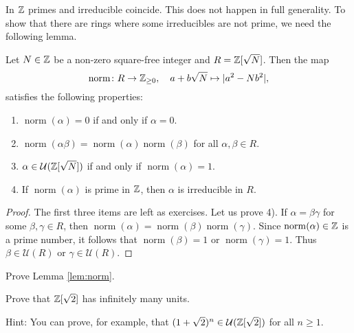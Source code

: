 In $\mathbb{Z}$ primes and irreducible coincide. 
This does not happen in full generality. 
To show that there are rings where some irreducibles are not prime, 
we need the following lemma. 

\begin{lemma}
\label{lem:norm}
Let $N\in\mathbb{Z}$ be a non-zero square-free integer and $R=\mathbb{Z}[\sqrt{N}]$. Then 
the map 
\[
	\operatorname{norm}\colon R\to\mathbb{Z}_{\geq0},
\quad a+b\sqrt{N}\mapsto 
|a^2-Nb^2|,
\]
satisfies the following properties:
\begin{enumerate}
	\item $\operatorname{norm}(\alpha)=0$ if and only if $\alpha=0$. 
	\item $\operatorname{norm}(\alpha\beta)=\operatorname{norm}(\alpha)\operatorname{norm}(\beta)$ for all $\alpha,\beta\in R$. 
	\item $\alpha\in\mathcal{U}(\mathbb{Z}[\sqrt{N}])$ if and only if $\operatorname{norm}(\alpha)=1$. 
	\item If $\operatorname{norm}(\alpha)$ is prime in $\mathbb{Z}$, then $\alpha$ is irreducible in $R$. 
\end{enumerate}	
\end{lemma}

\begin{proof}
	The first three items are left as exercises. Let us prove 4). 
	If $\alpha=\beta\gamma$ for some $\beta,\gamma\in R$, then
	$\operatorname{norm}(\alpha)=\operatorname{norm}(\beta)\operatorname{norm}(\gamma)$. Since $\operatorname{norm}(\alpha)\in\mathbb{Z}$ is a prime number, it follows that
	$\operatorname{norm}(\beta)=1$ or $\operatorname{norm}(\gamma)=1$. Thus $\beta\in\mathcal{U}(R)$ or $\gamma\in\mathcal{U}(R)$. 	
\end{proof}

\begin{exercise}
    Prove Lemma \ref{lem:norm}.
\end{exercise}

\begin{bonus}
    Prove that $\mathbb{Z}[\sqrt{2}]$ has infinitely many units. 
\end{bonus}

Hint: You can prove, for example, that $(1+\sqrt{2})^n\in\mathcal{U}(\mathbb{Z}[\sqrt{2}])$ 
for all $n\geq1$. 


